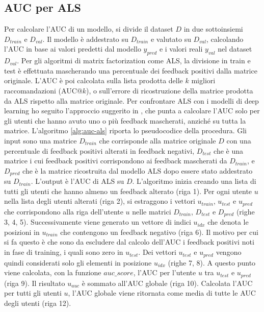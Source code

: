 \documentclass[12pt,italian]{report}
\begin{document}
\subsection{AUC per ALS}
Per calcolare l'AUC di un modello, si divide il dataset $D$ in due sottoinsiemi $D_{train}$ e $D_{val}$. Il modello è addestrato su $D_{train}$ e valutato su $D_{val}$, calcolando l'AUC in base ai valori predetti dal modello $y_{pred}$ e i valori reali $y_{val}$ nel dataset $D_{val}$. Per gli algoritmi di matrix factorization come ALS, la divisione in train e test è effettuata mascherando una percentuale dei feedback positivi dalla matrice originale. L'AUC è poi calcolata sulla lista prodotta delle $k$ migliori raccomandazioni (AUC@$k$), o sull'errore di ricostruzione della matrice prodotta da ALS rispetto alla matrice originale.
Per confrontare ALS con i modelli di deep learning ho seguito l'approccio suggerito in \cite{auc-als}, che punta a calcolare l'AUC solo per gli utenti che hanno avuto uno o più feedback mascherati, anziché su tutta la matrice. 
L'algoritmo \ref{alg:auc-als} riporta lo pseudocodice della procedura. Gli input sono una matrice $D_{train}$ che corrisponde alla matrice originale $D$ con una percentuale di feedback positivi alterati in feedback negativi, $D_{test}$ che è una matrice i cui feedback positivi corrispondono ai feedback mascherati da $D_{train}$, e $D_{pred}$ che è la matrice ricostruita dal modello ALS dopo essere stato addestrato su $D_{train}$. 
L'output è l'AUC di ALS su $D$. L'algoritmo inizia creando una lista di tutti gli utenti che hanno almeno un feedback alterato (riga 1). Per ogni utente $u$ nella lista degli utenti alterati (riga 2), si estraggono i vettori $u_{train}$, $u_{test}$ e $u_{pred}$ che corrispondono alla riga dell'utente $u$ nelle matrici $D_{train}$, $D_{test}$ e $D_{pred}$ (righe 3, 4, 5). 
Successivamente viene generato un vettore di indici $u_{idx}$ che denota le posizioni in $u_{train}$ che contengono un feedback negativo (riga 6). Il motivo per cui si fa questo è che sono da escludere dal calcolo dell'AUC i feedback positivi noti in fase di training, i quali sono zero in $u_{test}$. Dei vettori $u_{test}$ e $u_{pred}$ vengono quindi considerati solo gli elementi in posizione $u_{idx}$ (righe 7, 8).
A questo punto viene calcolata, con la funzione $auc\_score$, l'AUC per l'utente $u$ tra $u_{test}$ e $u_{pred}$ (riga 9). Il risultato $u_{auc}$ è sommato all'AUC globale (riga 10). Calcolata l'AUC per tutti gli utenti $u$, l'AUC globale viene ritornata come media di tutte le AUC degli utenti (riga 12).
\end{document}
